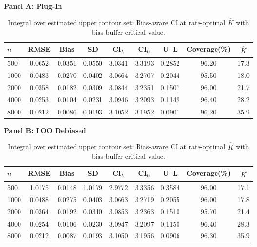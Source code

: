 \begin{table}[!h]
\centering
\small
\caption{Integral over estimated upper contour set: Bias-aware CI at rate-optimal $\hat{K}$ with bias buffer critical value.}
\label{tab:Sim2_Disk_BiasAware}
\vspace{0.3em}
\textbf{Panel A: Plug-In}
\begin{tabular}{lcccccccc}
\hline\hline
$n$ & RMSE & Bias & SD & CI$_L$ & CI$_U$ & U--L & Coverage(\%) & $\bar{\hat{K}}$\\
\hline
500 & 0.0652 & 0.0351 & 0.0550 & 3.0341 & 3.3193 & 0.2852 & 96.20 & 17.3\\
1000 & 0.0483 & 0.0270 & 0.0402 & 3.0664 & 3.2707 & 0.2044 & 95.50 & 18.0\\
2000 & 0.0358 & 0.0182 & 0.0309 & 3.0844 & 3.2351 & 0.1507 & 96.00 & 21.7\\
4000 & 0.0253 & 0.0104 & 0.0231 & 3.0946 & 3.2093 & 0.1148 & 96.40 & 28.2\\
8000 & 0.0212 & 0.0086 & 0.0193 & 3.1052 & 3.1952 & 0.0901 & 96.20 & 35.9\\
\hline\hline
\end{tabular}
\vspace{0.3em}
\textbf{Panel B: LOO Debiased}
\begin{tabular}{lcccccccc}
\hline\hline
$n$ & RMSE & Bias & SD & CI$_L$ & CI$_U$ & U--L & Coverage(\%) & $\bar{\hat{K}}$\\
\hline
500 & 1.0175 & 0.0148 & 1.0179 & 2.9772 & 3.3356 & 0.3584 & 96.00 & 17.1\\
1000 & 0.0488 & 0.0275 & 0.0403 & 3.0663 & 3.2719 & 0.2055 & 96.00 & 17.8\\
2000 & 0.0364 & 0.0192 & 0.0310 & 3.0853 & 3.2363 & 0.1510 & 95.70 & 21.4\\
4000 & 0.0254 & 0.0106 & 0.0230 & 3.0947 & 3.2097 & 0.1150 & 96.40 & 28.3\\
8000 & 0.0212 & 0.0087 & 0.0193 & 3.1050 & 3.1956 & 0.0906 & 96.30 & 35.9\\
\hline\hline
\end{tabular}
\end{table}
